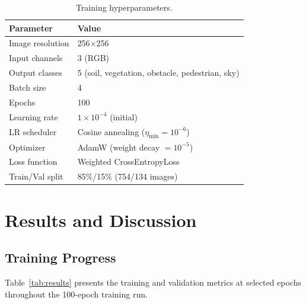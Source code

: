 \documentclass[12pt,a4paper]{article}
\begin{document}
\begin{table}[H]
\centering
\caption{Training hyperparameters.}
\label{tab:hyperparams}
\begin{tabular}{@{}ll@{}}
\toprule
\textbf{Parameter} & \textbf{Value} \\
\midrule
Image resolution & 256$\times$256 \\
Input channels & 3 (RGB) \\
Output classes & 5 (soil, vegetation, obstacle, pedestrian, sky) \\
Batch size & 4 \\
Epochs & 100 \\
Learning rate & $1 \times 10^{-4}$ (initial) \\
LR scheduler & Cosine annealing ($\eta_{\min} = 10^{-6}$) \\
Optimizer & AdamW (weight decay $= 10^{-5}$) \\
Loss function & Weighted CrossEntropyLoss \\
Train/Val split & 85\%/15\% (754/134 images) \\
\bottomrule
\end{tabular}
\end{table}

\section{Results and Discussion}
\label{sec:results}

\subsection{Training Progress}

Table~\ref{tab:results} presents the training and validation metrics at selected epochs throughout the 100-epoch training run.
\end{document}
